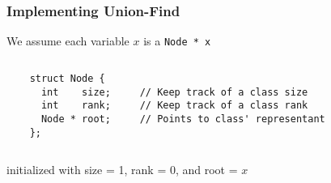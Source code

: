 \begin{frame}[fragile]
  \frametitle{Implementing Union-Find}

  \scriptsize

  We assume each variable $x$ is a {\tt Node * x}
  \begin{columns}
  \begin{column}{.7\textwidth}
  \begin{verbatim}
    struct Node { 
      int    size;     // Keep track of a class size
      int    rank;     // Keep track of a class rank
      Node * root;     // Points to class' representant
    };
  \end{verbatim} 
  \end{column}
  \begin{column}{.3\textwidth}
    \begin{center}
    
    \end{center}
  \end{column}
  \end{columns}
  initialized with size = 1, rank = 0, and root = $x$ 
  \vfill
  \begin{columns}


\end{columns}
\end{frame}
